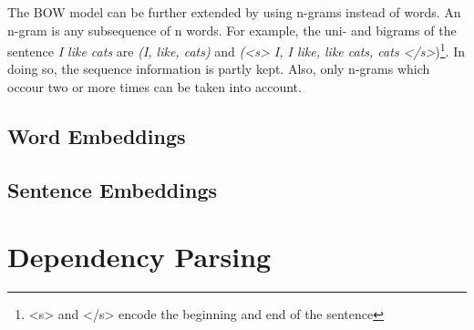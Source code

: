 The BOW model can be further extended by using n-grams instead of words. An n-gram is any subsequence of n words. For example, the uni- and bigrams of the sentence \emph{I like cats} are \emph{(I, like, cats)} and \emph{(<s> I, I like, like cats, cats </s>})\footnote{<s> and </s> encode the beginning and end of the sentence}. In doing so, the sequence information is partly kept. Also, only n-grams which occour two or more times can be taken into account.







\subsection{Word Embeddings}
\subsection{Sentence Embeddings}

\section{Dependency Parsing}
